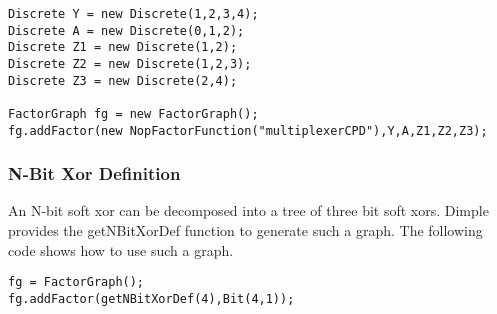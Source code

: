 \ifjava
\begin{lstlisting}
Discrete Y = new Discrete(1,2,3,4);
Discrete A = new Discrete(0,1,2);
Discrete Z1 = new Discrete(1,2);
Discrete Z2 = new Discrete(1,2,3);
Discrete Z3 = new Discrete(2,4);

FactorGraph fg = new FactorGraph();
fg.addFactor(new NopFactorFunction("multiplexerCPD"),Y,A,Z1,Z2,Z3);
\end{lstlisting}
\fi

\ifmatlab
\subsubsection{N-Bit Xor Definition}
An N-bit soft xor can be decomposed into a tree of three bit soft xors.  Dimple provides the getNBitXorDef function to generate such a graph.  The following code shows how to use such a graph.

\begin{lstlisting}
fg = FactorGraph();
fg.addFactor(getNBitXorDef(4),Bit(4,1));
\end{lstlisting}

\fi